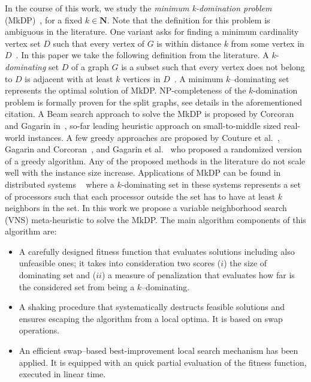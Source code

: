 \documentclass[dvipsnames,format=sigconf,anonymous=true,review=true]{acmart}
\begin{document}
In the course of this work, we study the \emph{minimum k-domination problem} (MkDP)~\cite{corcoran2021heuristics}, for a fixed $k \in \mathbf{N}$.  Note that the definition for this problem is ambiguous in the literature. One variant asks for finding a minimum cardinality vertex set $ D$ such that every vertex of $G$ is within distance $k$ from some vertex in $D$~\cite{chang1983k}. 
In this paper we take the following definition from the literature.   A $k$-\emph{dominating}  set  $D$ of a graph $G$ is a subset such that every vertex does not belong to $D$ is adjacent with at least $k$ vertices in  $D$~\cite{lan2013algorithmic}. A minimum $k$--dominating set represents the optimal solution of MkDP.  NP-completeness of the $k$-domination problem is formally proven for the split graphs, %
 see details in the aforementioned citation. A Beam search approach to solve the MkDP is proposed by Corcoran and Gagarin   in~\cite{corcoran2021heuristics}, so-far leading heuristic approach on small-to-middle sized real-world instances. A few greedy approaches are proposed by Couture et al.~\cite{couture2006incremental}, Gagarin and Corcoran~\cite{gagarin2018multiple}, and  Gagarin et al.~\cite{gagarin2013randomized} who proposed a randomized version of a greedy algorithm. Any of the proposed methods in the literature do not scale well with the instance size increase.   
Applications of MkDP can be found in  distributed systems  ~\cite{wang2013minimising} where  a $k$-dominating set in these systems represents a set of processors such that each processor outside the set has to have at least $k$ neighbors in the set.
In this work we propose  a variable neighborhood search (VNS) meta-heuristic to solve the MkDP.    The main algorithm components of this algorithm are:
\begin{itemize}
	\item A carefully designed fitness function that evaluates solutions  including also unfeasible ones; it takes into consideration two scores ($i$) the size of dominating set and ($ii$) a measure of penalization that evaluates how far is the considered set from being a $k$--dominating. 
	\item A shaking procedure that systematically destructs feasible solutions and ensures escaping the algorithm from a local optima. It is based on swap operations. 
	\item An efficient swap--based  best-improvement local search mechanism   has been applied. It is equipped with an quick partial evaluation of the fitness function, executed in linear time.
 
\end{itemize}
\end{document}
